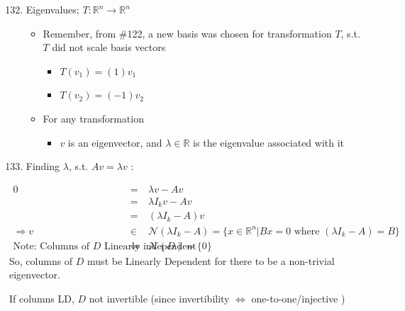 \documentclass[10pt,letterpaper]{article}
\begin{document}
\begin{enumerate}
\setcounter{enumi}{131}
\item  Eigenvalues; $T: \mathbb{R}^{n} \rightarrow \mathbb{R}^{n}$

\begin{itemize}
\item Remember, from \#122, a new basis was chosen for transformation $T$, s.t. $T$ did not scale basis vectors

\begin{itemize}
\item $T(v_1)= (1)v_1$
\item $T(v_2)= (-1)v_2$
\end{itemize}

\item For any transformation 

\begin{itemize}
\item $v$ is an eigenvector, and $\lambda \in \mathbb{R}$ is the eigenvalue associated with it
\end{itemize}

\end{itemize}

\item Finding $\lambda$, s.t. $Av=\lambda v$ :
\end{enumerate}
\begin{eqnarray}
    0 &=& \lambda v - Av \\
     &=& \lambda I_k v - Av  \\
     &=& (\lambda I_k - A)v  \\
     \Rightarrow v &\in& \mathcal{N}(\lambda I_k - A) = \{ x \in \mathbb{R}^{n} | B x = 0 \text{ where } (\lambda I_k - A)= B \} \\
    \text{Note: Columns of } D \text{ Linearly independent } &\Leftrightarrow& \mathcal{N}(D) = \{0\}
\end{eqnarray}
\hspace{1.2cm} \textbullet{} So, columns of $D$ must be Linearly Dependent for there to be a non-trivial eigenvector.

\hspace{1.2cm} \textbullet{} If columns LD, $D$ not invertible (since invertibility $\Leftrightarrow$ one-to-one/injective )
\end{document}
